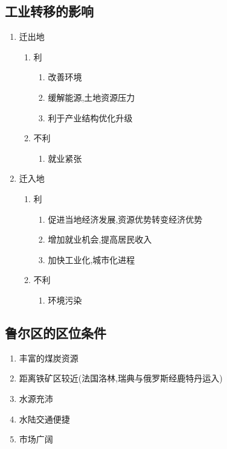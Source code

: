 \documentclass[a4paper]{article}
\begin{document}
    \subsection{工业转移的影响}
    \begin{enumerate}
        \item 迁出地
        \begin{enumerate}
            \item 利
            \begin{enumerate}
                \item 改善环境
                \item 缓解能源,土地资源压力
                \item 利于产业结构优化升级
            \end{enumerate}
            \item 不利
            \begin{enumerate}
                \item 就业紧张
            \end{enumerate}
        \end{enumerate}
        \item 迁入地
        \begin{enumerate}
            \item 利
            \begin{enumerate}
                \item 促进当地经济发展,资源优势转变经济优势
                \item 增加就业机会,提高居民收入
                \item 加快工业化,城市化进程
            \end{enumerate}
            \item 不利
            \begin{enumerate}
                \item 环境污染
            \end{enumerate}
        \end{enumerate}
    \end{enumerate}
    \subsection{鲁尔区的区位条件}
    \begin{enumerate}
        \item 丰富的煤炭资源
        \item 距离铁矿区较近(法国洛林,瑞典与俄罗斯经鹿特丹运入)
        \item 水源充沛
        \item 水陆交通便捷
        \item 市场广阔
    \end{enumerate}
\end{document}
